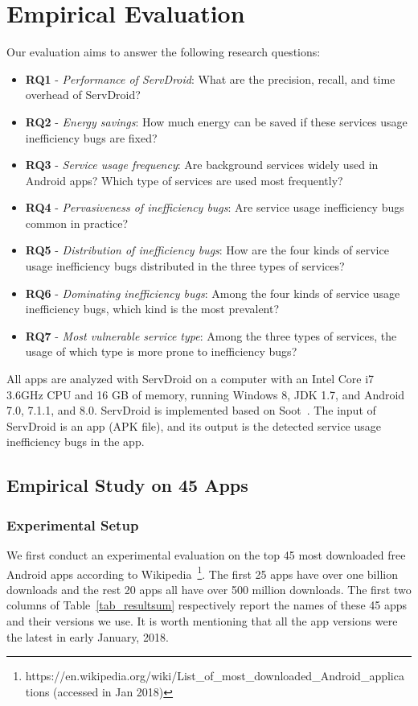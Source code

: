 \documentclass[sigconf,review, anonymous]{acmart}
\begin{document}
\section{Empirical Evaluation}\label{evaluation}
Our evaluation aims to answer the following research questions:

\begin{itemize}
\item {\bf RQ1} - {\it Performance of \textsf{ServDroid}}: What are the
precision, recall, and time overhead of \textsf{ServDroid}?
\item {\bf RQ2} - {\it Energy savings}: How much energy can be saved if these
services usage inefficiency bugs are fixed?
\item {\bf RQ3} - {\it Service usage frequency}: Are background services widely
used in Android apps? Which type of services are used most frequently?
\item {\bf RQ4} - {\it Pervasiveness of inefficiency bugs}: Are service usage inefficiency bugs common in practice?
\item {\bf RQ5} - {\it Distribution of inefficiency bugs}: How are the four kinds of service usage inefficiency bugs distributed in the three types of services?
\item {\bf RQ6} - {\it Dominating inefficiency bugs}: Among the four kinds of service usage inefficiency bugs, which kind is the most prevalent?
\item {\bf RQ7} - {\it Most vulnerable service type}: Among the three types of services, the usage of which type is more prone to inefficiency bugs?
\end{itemize}

All apps are analyzed with \textsf{ServDroid} on a computer with an Intel Core
i7 3.6GHz CPU and 16 GB of memory, running Windows 8, JDK 1.7, and Android 7.0, 7.1.1, and 8.0.
{\sf ServDroid} is implemented based on {\sf
Soot}~\cite{sootpaper}. The input of {\sf ServDroid} is an app (APK file), and
its output is the detected service usage inefficiency bugs in the app.

\subsection{Empirical Study on 45 Apps}

\subsubsection{Experimental Setup}
We first conduct an experimental evaluation on the top 45 most
downloaded free Android apps according to Wikipedia~\footnote{https://en.wikipedia.org/wiki/List\_of\_most\_downloaded\_Android\_applica\\tions
(accessed in Jan 2018)}. The first 25 apps have
over one billion downloads and the rest 20 apps all have over 500 million
downloads. The first two columns of Table~\ref{tab_resultsum} respectively
report the names of these 45 apps and their versions we use. It is worth
mentioning that all the app versions were the latest in early January, 2018.
\end{document}
